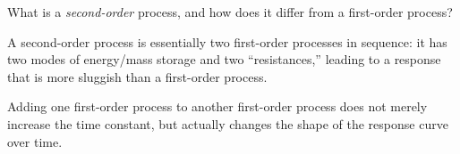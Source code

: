 

What is a {\it second-order} process, and how does it differ from a first-order process?







A second-order process is essentially two first-order processes in sequence: it has two modes of energy/mass storage and two ``resistances,'' leading to a response that is more sluggish than a first-order process.







Adding one first-order process to another first-order process does not merely increase the time constant, but actually changes the shape of the response curve over time.




